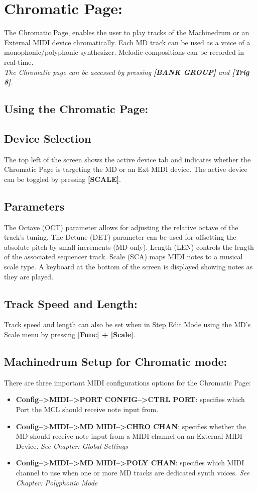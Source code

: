 \chapter{Chromatic Page:}
The Chromatic Page, enables the user to play tracks of the Machinedrum or an External MIDI device chromatically. Each MD track can be used as a voice of a monophonic/polyphonic synthesizer. Melodic compositions can be recorded in real-time.
\\
\textit{The Chromatic page can be accessed by pressing \textbf{[BANK GROUP]} and \textbf{[Trig 8]}.}
\\
\section{Using the Chromatic Page:}
\section{Device Selection}
The top left of the screen shows the active device tab and indicates whether the Chromatic Page is targeting the MD or an Ext MIDI device. The active device can be toggled by pressing \textbf{[SCALE]}.
\newpage
\section{Parameters}
The Octave (OCT) parameter allows for adjusting the relative octave of the track's tuning. The Detune (DET) parameter can be used for offsetting the absolute pitch by small increments (MD only). Length (LEN) controls the length of the associated sequencer track. Scale (SCA) maps MIDI notes to a musical scale type.
A keyboard at the bottom of the screen is displayed showing notes as they are played.
\section{Track Speed and Length:}
Track speed and length can also be set when in Step Edit Mode using the MD's Scale menu by pressing \textbf{[Func] + [Scale]}.
\section{Machinedrum Setup for Chromatic mode:}
There are three important MIDI configurations options for the Chromatic Page:
\begin{itemize}
    \item \textbf{Config-->MIDI-->PORT CONFIG-->CTRL PORT}: specifies which Port the MCL should receive note input from. 
    \item \textbf{Config-->MIDI-->MD MIDI-->CHRO CHAN}: specifies whether the MD should receive note input from a MIDI channel on an External MIDI Device. \textit{See Chapter: Global Settings}
    \item \textbf{Config-->MIDI-->MD MIDI-->POLY CHAN}: specifies which MIDI channel to use when one or more MD tracks are dedicated synth voices. \textit{See Chapter: Polyphonic Mode} 
\end{itemize}

